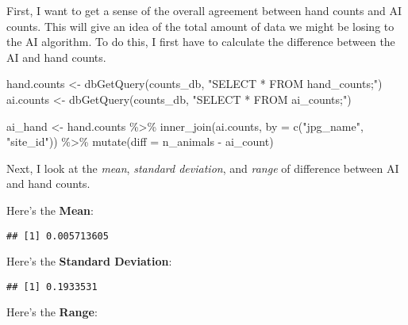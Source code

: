 \documentclass[
]{book}
\newenvironment{Shaded}{\begin{snugshade}}{\end{snugshade}}
\newcommand{\AttributeTok}[1]{\textcolor[rgb]{0.77,0.63,0.00}{#1}}
\newcommand{\FunctionTok}[1]{\textcolor[rgb]{0.00,0.00,0.00}{#1}}
\newcommand{\NormalTok}[1]{#1}
\newcommand{\OtherTok}[1]{\textcolor[rgb]{0.56,0.35,0.01}{#1}}
\newcommand{\SpecialCharTok}[1]{\textcolor[rgb]{0.00,0.00,0.00}{#1}}
\newcommand{\StringTok}[1]{\textcolor[rgb]{0.31,0.60,0.02}{#1}}
\begin{document}
First, I want to get a sense of the overall agreement between hand counts and AI counts. This will give an idea of the total amount of data we might be losing to the AI algorithm. To do this, I first have to calculate the difference between the AI and hand counts.

\begin{Shaded}
\begin{Highlighting}[]
\NormalTok{hand.counts }\OtherTok{\textless{}{-}} \FunctionTok{dbGetQuery}\NormalTok{(counts\_db, }\StringTok{"SELECT * FROM hand\_counts;"}\NormalTok{)}
\NormalTok{ai.counts }\OtherTok{\textless{}{-}} \FunctionTok{dbGetQuery}\NormalTok{(counts\_db, }\StringTok{"SELECT * FROM ai\_counts;"}\NormalTok{)}

\NormalTok{ai\_hand }\OtherTok{\textless{}{-}}\NormalTok{ hand.counts }\SpecialCharTok{\%\textgreater{}\%} 
  \FunctionTok{inner\_join}\NormalTok{(ai.counts, }\AttributeTok{by =} \FunctionTok{c}\NormalTok{(}\StringTok{"jpg\_name"}\NormalTok{, }\StringTok{"site\_id"}\NormalTok{)) }\SpecialCharTok{\%\textgreater{}\%}
  \FunctionTok{mutate}\NormalTok{(}\AttributeTok{diff =}\NormalTok{ n\_animals }\SpecialCharTok{{-}}\NormalTok{ ai\_count)}
\end{Highlighting}
\end{Shaded}

Next, I look at the \emph{mean}, \emph{standard deviation}, and \emph{range} of difference between AI and hand counts.

\begin{Shaded}
\end{Shaded}

Here's the \textbf{Mean}:

\begin{verbatim}
## [1] 0.005713605
\end{verbatim}

Here's the \textbf{Standard Deviation}:

\begin{verbatim}
## [1] 0.1933531
\end{verbatim}

Here's the \textbf{Range}:
\end{document}
